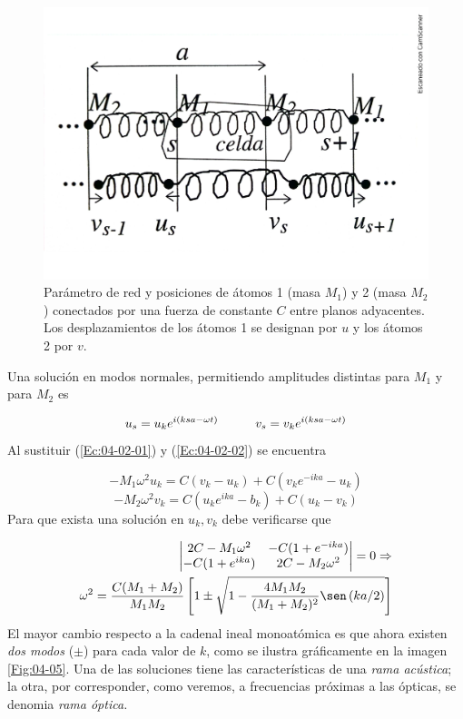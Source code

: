 \begin{figure}[h!] \centering
    \includegraphics[scale=0.4]{Cuerpo/Ch_04/Fotos libro 4.pdf}
    \caption{Parámetro de red y posiciones de átomos 1 (masa $M_1$) y 2 (masa $M_2$) conectados por una fuerza de constante $C$ entre planos adyacentes. Los desplazamientos de los átomos 1 se designan por $u$ y los átomos 2 por $v$.}
    \label{Fig:04-04}
\end{figure}    

Una solución en modos normales, permitiendo amplitudes distintas para $M_1$ y para $M_2$ es 

\begin{equation}
	u_s = u_k e^{i(ksa-\omega  t)} \quad \quad \quad v_s = v_k e^{i(ksa-\omega t)} \label{Ec:04-02-02}
\end{equation}
Al sustituir (\ref{Ec:04-02-01}) y (\ref{Ec:04-02-02}) se encuentra 

\begin{equation}
    -M_1 \omega^2 u_k = C(v_k - u_k) + C(v_k e^{-ika}-u_k)
\end{equation}
\begin{equation*}
    -M_2 \omega^2 v_k = C(u_k e^{ika} - b_k) + C(u_k - v_k)    
\end{equation*}
Para que exista una solución en $u_k,v_k$ debe verificarse que

\begin{eqnarray}
    \begin{vmatrix}
        2C - M_1\omega^2 & -C(1+e^{-ika})\\
        -C (1+e^{ika}) & 2C - M_2 \omega^2  
    \end{vmatrix}= 0 \Rightarrow \\
    \omega^2 = \frac{C(M_1+M_2)}{M_1M_2} \ccorchetes{1 \pm \sqrt{1-\frac{4M_1M_2}{(M_1+M_2)^2} \sen \parentesis{  ka/2}}}
\end{eqnarray}
El mayor cambio respecto a la cadenal ineal monoatómica es que ahora existen \textit{dos modos} ($\pm$) para cada valor de $k$, como se ilustra gráficamente en la imagen \ref{Fig:04-05}. Una de las soluciones tiene las características de una \textit{rama acústica}; la otra, por corresponder, como veremos, a frecuencias próximas a las ópticas, se denomia \textit{rama óptica.}


